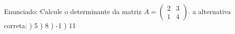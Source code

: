 \documentclass[preview]{standalone}
\begin{document}
\begin{center}
Enunciado: Calcule o determinante da matriz \( A = \begin{pmatrix} 2 & 3 \\ 1 & 4 \end{pmatrix} \). \nEscolha a alternativa correta: \na) 5 \nb) 8 \nc) -1 \nd) 11
\end{center}
\end{document}
